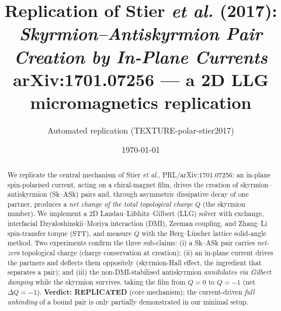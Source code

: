 \documentclass[11pt]{article}
\title{Replication of Stier \textit{et al.} (2017):\\
\emph{Skyrmion--Antiskyrmion Pair Creation by In-Plane Currents}\\
\large arXiv:1701.07256 --- a 2D LLG micromagnetics replication}
\author{Automated replication (TEXTURE-polar-stier2017)}
\date{\today}
\begin{document}
\maketitle

\begin{abstract}
We replicate the central mechanism of Stier \textit{et al.}, PRL/arXiv:1701.07256:
an in-plane spin-polarised current, acting on a chiral-magnet film, drives the
creation of skyrmion--antiskyrmion (Sk--ASk) pairs and, through asymmetric
dissipative decay of one partner, produces a \emph{net change of the total
topological charge} $Q$ (the skyrmion number). We implement a 2D
Landau--Lifshitz--Gilbert (LLG) solver with exchange, interfacial
Dzyaloshinskii--Moriya interaction (DMI), Zeeman coupling, and Zhang--Li
spin-transfer torque (STT), and measure $Q$ with the Berg--L\"uscher lattice
solid-angle method. Two experiments confirm the three sub-claims: (i) a Sk--ASk
pair carries \emph{net-zero} topological charge (charge conservation at
creation); (ii) an in-plane current drives the partners and deflects them
oppositely (skyrmion-Hall effect, the ingredient that separates a pair); and
(iii) the non-DMI-stabilised antiskyrmion \emph{annihilates via Gilbert
damping} while the skyrmion survives, taking the film from $Q=0$ to $Q=-1$
(net $\Delta Q=-1$). \textbf{Verdict: REPLICATED} (core mechanism); the
current-driven \emph{full unbinding} of a bound pair is only partially
demonstrated in our minimal setup.
\end{abstract}
\end{document}
